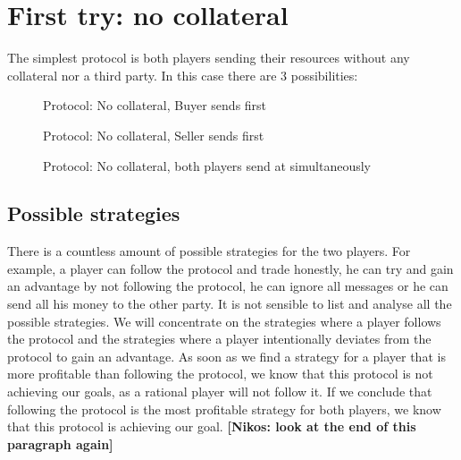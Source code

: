 \documentclass{cacthesis}
\newcommand{\authnote}[3]{{ \footnotesize \textbf{#1[#2: #3]~}}}
\newcommand{\niknote}[1]{\authnote{\color{red}}{Nikos}{#1}}
\begin{document}
\section{First try: no collateral}
\label{sec:first-try-nocol}
The simplest protocol is both players sending their resources without any collateral nor a third party. In this case there are 3 possibilities:
\begin{figure}[htb!]
    \centering
    \caption{Protocol: No collateral, Buyer sends first}
    \label{pro:naive-buyer-first}
\end{figure}

\begin{figure}[htb!]
    \centering
    \caption{Protocol: No collateral, Seller sends first}
    \label{pro:naive-seller-first}
\end{figure}

\begin{figure}[htb!]
    \centering
    \caption{Protocol: No collateral, both players send at simultaneously}
    \label{pro:naive-simultaneous}
\end{figure}


\subsection{Possible strategies}
\label{sec:possible-strategies}
There is a countless amount of possible strategies for the two players. For example, a player can follow the protocol and trade honestly, he can try and gain an advantage by not following the protocol, he can ignore all messages or he can send all his money to the other party. It is not sensible to list and analyse all the possible strategies. We will concentrate on the strategies where a player follows the protocol and the strategies where a player intentionally deviates from the protocol to gain an advantage. As soon as we find a strategy for a player that is more profitable than following the protocol, we know that this protocol is not achieving our goals, as a rational player will not follow it. If we conclude that following the protocol is the most profitable strategy for both players, we know that this protocol is achieving our goal. \niknote{look at the end of this paragraph again} \newline
\end{document}
